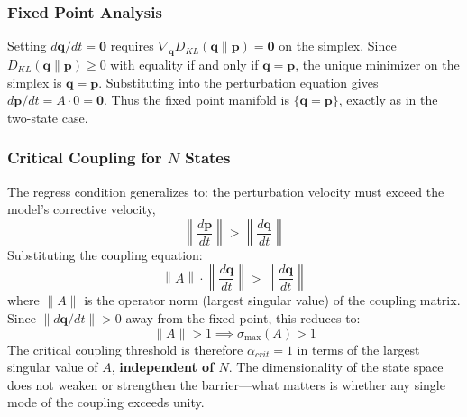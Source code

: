 \documentclass[12pt]{article}
\begin{document}
\subsubsection{Fixed Point Analysis}
Setting $d\mathbf{q}/dt = \mathbf{0}$ requires $\nabla_{\mathbf{q}} D_{KL}(\mathbf{q}\|\mathbf{p}) = \mathbf{0}$ on the simplex. Since $D_{KL}(\mathbf{q}\|\mathbf{p}) \ge 0$ with equality if and only if $\mathbf{q} = \mathbf{p}$, the unique minimizer on the simplex is $\mathbf{q} = \mathbf{p}$. Substituting into the perturbation equation gives $d\mathbf{p}/dt = A \cdot 0 = \mathbf{0}$. Thus the fixed point manifold is $\{\mathbf{q} = \mathbf{p}\}$, exactly as in the two-state case.

\subsubsection{Critical Coupling for $N$ States}
The regress condition generalizes to: the perturbation velocity must exceed the model's corrective velocity,
\begin{equation}
    \left\| \frac{d\mathbf{p}}{dt} \right\| > \left\| \frac{d\mathbf{q}}{dt} \right\|
\end{equation}
Substituting the coupling equation:
\begin{equation}
    \left\| A \right\| \cdot \left\| \frac{d\mathbf{q}}{dt} \right\| > \left\| \frac{d\mathbf{q}}{dt} \right\|
\end{equation}
where $\|A\|$ is the operator norm (largest singular value) of the coupling matrix. Since $\|d\mathbf{q}/dt\| > 0$ away from the fixed point, this reduces to:
\begin{equation}
    \|A\| > 1 \implies \sigma_{\max}(A) > 1
\end{equation}
The critical coupling threshold is therefore $\alpha_{crit} = 1$ in terms of the largest singular value of $A$, \textbf{independent of $N$}. The dimensionality of the state space does not weaken or strengthen the barrier---what matters is whether any single mode of the coupling exceeds unity.
\end{document}
